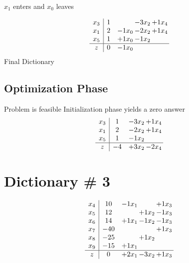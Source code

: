 \documentclass[12pt]{article}
\begin{document}
 $ x_{1} $ enters and $ x_{0} $ leaves 

 \[\begin{array}{c| c c@{\hskip 2pt} c@{\hskip 2pt} c@{\hskip 2pt} }
 x_{3}   &  1  &   & -3  x_{2} & + 1  x_{4}\\
 x_{1}   &  2 & -1  x_{0} & -2  x_{2} & + 1  x_{4}\\
 x_{5}   &  1 & + 1  x_{0} & -1  x_{2} &   \\
\hline
z    &  0 & -1  x_{0} &    &   \\
\end{array}\]
Final Dictionary

\subsection{Optimization Phase}

Problem is feasible Initialization phase yields a zero answer 
\[\begin{array}{c| c c@{\hskip 2pt} c@{\hskip 2pt} }
 x_{3}   &  1 & -3  x_{2} & + 1  x_{4}\\
 x_{1}   &  2 & -2  x_{2} & + 1  x_{4}\\
 x_{5}   &  1 & -1  x_{2} &   \\
\hline
z    &  -4 & + 3  x_{2} & -2  x_{4}\\
\end{array}\]


\section{Dictionary \# 3}

\[\begin{array}{c| c c@{\hskip 2pt} c@{\hskip 2pt} c@{\hskip 2pt} }
 x_{4}   &  10 & -1  x_{1} &   & + 1  x_{3}\\
 x_{5}   &  12  &   & + 1  x_{2} & -1  x_{3}\\
 x_{6}   &  14 & + 1  x_{1} & -1  x_{2} & -1  x_{3}\\
 x_{7}   &  -40  &    &   & + 1  x_{3}\\
 x_{8}   &  -25  &   & + 1  x_{2} &   \\
 x_{9}   &  -15 & + 1  x_{1} &    &   \\
\hline
z    &  0 & + 2  x_{1} & -3  x_{2} & + 1  x_{3}\\
\end{array}\]
\end{document}
